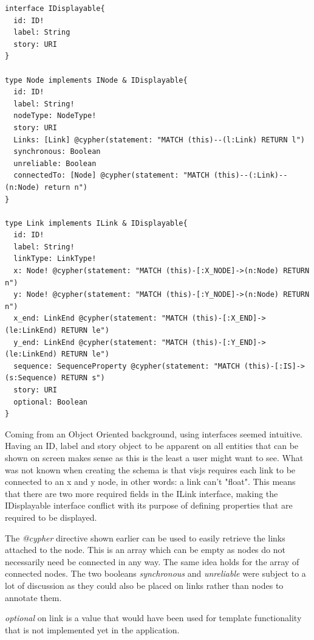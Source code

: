 \begin{lstlisting}[caption={Usage of Interfaces in GraphQL}]
interface IDisplayable{
  id: ID!
  label: String
  story: URI
}

type Node implements INode & IDisplayable{
  id: ID!
  label: String!
  nodeType: NodeType!
  story: URI
  Links: [Link] @cypher(statement: "MATCH (this)--(l:Link) RETURN l")
  synchronous: Boolean
  unreliable: Boolean
  connectedTo: [Node] @cypher(statement: "MATCH (this)--(:Link)--(n:Node) return n")
}
  
type Link implements ILink & IDisplayable{
  id: ID!
  label: String!
  linkType: LinkType!
  x: Node! @cypher(statement: "MATCH (this)-[:X_NODE]->(n:Node) RETURN n")
  y: Node! @cypher(statement: "MATCH (this)-[:Y_NODE]->(n:Node) RETURN n")
  x_end: LinkEnd @cypher(statement: "MATCH (this)-[:X_END]->(le:LinkEnd) RETURN le")
  y_end: LinkEnd @cypher(statement: "MATCH (this)-[:Y_END]->(le:LinkEnd) RETURN le")
  sequence: SequenceProperty @cypher(statement: "MATCH (this)-[:IS]->(s:Sequence) RETURN s")
  story: URI
  optional: Boolean
}

\end{lstlisting}
Coming from an Object Oriented background, using interfaces seemed intuitive. Having an ID, label and story object to be apparent on all entities that can be shown on screen makes sense as this is the least a user might want to see. What was not known when creating the schema is that visjs requires each link to be connected to an x and y node, in other words: a link can't "float". This means that there are two more required fields in the ILink interface, making the IDisplayable interface conflict with its purpose of defining properties that are required to be displayed.

The \emph{@cypher} directive shown earlier can be used to easily retrieve the links attached to the node. This is an array which can be empty as nodes do not necessarily need be connected in any way. The same idea holds for the array of connected nodes. The two booleans \emph{synchronous} and \emph{unreliable} were subject to a lot of discussion as they could also be placed on links rather than nodes to annotate them.

\emph{optional} on link is a value that would have been used for template functionality that is not implemented yet in the application.

